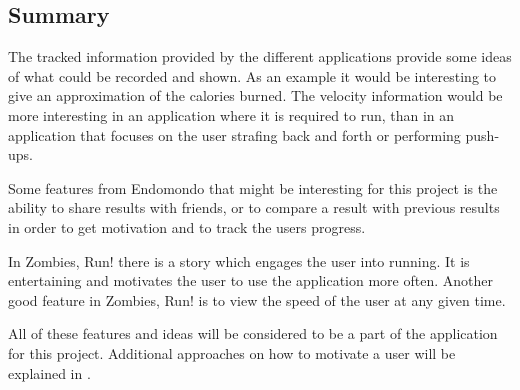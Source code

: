 \subsection{Summary}
The tracked information provided by the different applications provide some ideas of what could be recorded and shown. 
As an example it would be interesting to give an approximation of the calories burned.
The velocity information would be more interesting in an application where it is required to run, than in an application that focuses on the user strafing back and forth or performing push-ups.

Some features from Endomondo that might be interesting for this project is the ability to share results with friends, or to compare a result with previous results in order to get motivation and to track the users progress.

In Zombies, Run! there is a story which engages the user into running. 
It is entertaining and motivates the user to use the application more often.
Another good feature in Zombies, Run! is to view the speed of the user at any given time.

All of these features and ideas will be considered to be a part of the application for this project.
Additional approaches on how to motivate a user will be explained in .